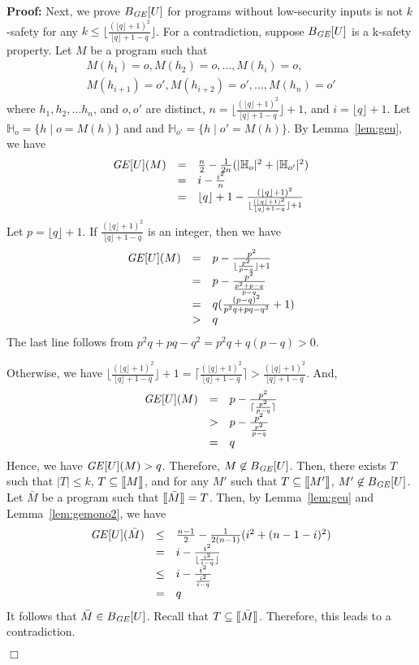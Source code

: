 \documentclass{llncs}
\newenvironment{proof}{\noindent\rm{\bf Proof:}}{\hbox{$\Box$}\vspace*{0.2\baselineskip}}
\newcommand{\aset}[1]{\{{#1}\}}
\newcommand{\sembrack}[1]{[\hspace*{-1.2pt}[#1]\hspace*{-1.2pt}]}
\begin{document}
\begin{proof}
Next, we prove $B_{\it GE}[U]$ for programs without low-security inputs
is not $k$-safety for any $k \leq \lfloor\frac{(\lfloor q\rfloor
  +1)^2}{\lfloor q\rfloor +1 -q} \rfloor$.  For a contradiction,
suppose $B_{\it GE}[U]$ is a k-safety property.  Let $M$ be a program
such that
\[
\begin{array}{l}
M(h_1)=o, M(h_2)=o, \dots, M(h_i)=o, \\
M(h_{i+1})=o', M(h_{i+2})=o', \dots, M(h_{n})=o'
\end{array}
\]
where $h_1,h_2,\dots h_n$, and $o,o'$ are distinct,
$n=\lfloor\frac{(\lfloor q\rfloor +1)^2}{\lfloor q\rfloor +1 -q}
\rfloor +1$, and $i=\lfloor q\rfloor +1$.  Let
$\mathbb{H}_o=\aset{h\mid o=M(h)}$ and and
$\mathbb{H}_{o'}=\aset{h\mid o'=M(h)}$.  By Lemma~\ref{lem:geu}, we
have
\[
\begin{array}{rcl} 
  {\it
    GE}[U](M)&=&\frac{n}{2}-\frac{1}{2n}(|\mathbb{H}_o|^2+|\mathbb{H}_{o'}|^2)\\
  &=&i-\frac{i^2}{n}\\
  &=&\lfloor q\rfloor +1 -\frac{(\lfloor q\rfloor+1)^2}{\lfloor\frac{(\lfloor q\rfloor +1)^2}{\lfloor q\rfloor +1 -q}
    \rfloor+1}
\end{array}
\]
Let $p=\lfloor q\rfloor +1$.  If $\frac{(\lfloor q\rfloor
  +1)^2}{\lfloor q\rfloor +1 -q}$ is an integer, then we have
\[
\begin{array}{rcl}
  {\it GE}[U](M)&=&
  p -\frac{p^2}{\lfloor\frac{p^2}{p -q}\rfloor+1}\\
  &=&p -\frac{p^2}{\frac{p^2+p -q}{p -q}}\\
  &=&q(\frac{(p-q)^2}{p^2q+pq -q^2}+1)\\
  &>&q
\end{array}
\]
The last line follows from $p^2q+pq -q^2 = p^2q+q(p-q) > 0$.

Otherwise, we have $\lfloor\frac{(\lfloor q\rfloor +1)^2}{\lfloor
  q\rfloor +1 -q}\rfloor+1=\lceil\frac{(\lfloor q\rfloor +1)^2}{\lfloor
  q\rfloor +1 -q}\rceil>\frac{(\lfloor q\rfloor +1)^2}{\lfloor q\rfloor
  +1 -q}$.  And,
\[
\begin{array}{rcl}
  {\it GE}[U](M)&=&
  p -\frac{p^2}{\lceil\frac{p^2}{p -q}\rceil}\\
  &>&p -\frac{p^2}{\frac{p^2}{p -q}}\\
  &=&q
\end{array}
\]
Hence, we have ${\it GE}[U](M)>q$.  Therefore, $M\not\in B_{\it GE}[U]$.  Then,
there exists $T$ such that $|T|\le k$, $T\subseteq\sembrack{M}$, and
for any $M'$ such that $T\subseteq \sembrack{M'}$, $M'\not\in B_{\it
GE}[U]$.  Let $\bar{M}$ be a program such that $\sembrack{\bar{M}}=T$.
Then, by Lemma~\ref{lem:geu} and Lemma~\ref{lem:gemono2}, we have
\[
\begin{array}{rcl}
  {\it GE}[U](\bar{M})&\le&\frac{n-1}{2}-\frac{1}{2(n-1)}(i^2 + (n-1-i)^2)\\
  &=&i - \frac{i^2}{\lfloor \frac{i^2}{i -q}\rfloor}\\
  &\le& i - \frac{i^2}{\frac{i^2}{i -q}}\\
  &=&q
\end{array}
\]
It follows that $\bar{M}\in B_{\it GE}[U]$.  Recall that
$T\subseteq\sembrack{\bar{M}}$.  Therefore, this leads to a
contradiction.


\end{proof}
\end{document}
